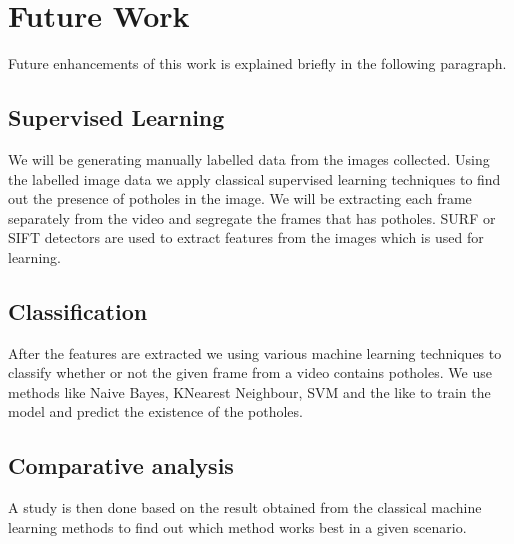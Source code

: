 \documentclass[12pt,a4paper]{article}
\begin{document}
\begin{itemize}
%
%    
\end{itemize}

\section{Future Work}
Future enhancements of this work is explained briefly in the following paragraph.


\subsection{Supervised Learning}
We will be generating manually labelled data from the images collected. Using the labelled image data we apply classical supervised learning techniques to find out the presence of potholes in the image. We will be extracting each frame separately from the video and segregate the frames that has potholes. SURF or SIFT detectors are used to extract features from the images which is used for learning. 

\subsection{Classification}
After the features are extracted we using various machine learning techniques to classify whether or not the given frame from a video contains potholes. We use methods like Naive Bayes, KNearest Neighbour, SVM and the like to train the model and predict the existence of the potholes.


\subsection{Comparative analysis}
A study is then done based on the result obtained from the classical machine learning methods to find out which method works best in a given scenario.
\end{document}
